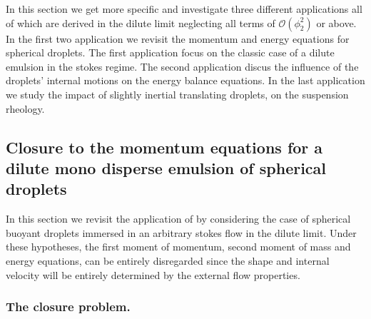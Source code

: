 
In this section we get more specific and investigate three different applications all of which are derived in the dilute limit neglecting all terms of $\mathcal{O}(\phi_2^2)$ or above.
In the first two application we revisit the momentum and energy equations for spherical droplets.
The first application focus on the classic case of a dilute emulsion in the stokes regime. 
The second application discus the influence of the droplets' internal motions on the energy balance equations. 
In the last application we study the impact of slightly inertial translating droplets, on the suspension rheology. 


\subsection{Closure to the momentum equations for a dilute mono disperse emulsion of spherical droplets}
In this section we revisit the application of  \citet[Appendix A]{zhang1997momentum} by considering the case of spherical buoyant droplets immersed in an arbitrary stokes flow in the dilute limit. 
Under these hypotheses, the first moment of momentum, second moment of mass and energy equations, can be entirely disregarded since the shape and internal velocity will be entirely determined by the external flow properties. 

\subsubsection*{The closure problem. }



